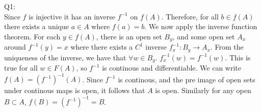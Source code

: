 \documentclass[letterpaper]{article}
\begin{document}
Q1: \\
Since $f$ is injective it has an inverse $f^{-1}$ on $f(A)$. Therefore, for all $b\in f(A)$ there exists a unique $a\in A$ where $f(a) = b$. 
We now apply the inverse function theorem. For each $y\in f(A)$, there is an open set $B_y$, and some open set $A_x$ around $f^{-1}(y)=x$ where there exists a $C^1$ inverse $f^{-1}_x: B_y \rightarrow A_x$. From the 
uniqueness of the inverse, we have that $\forall w\in B_y$. $f_x^{-1}(w)=f^{-1}(w)$. This is true for all $w\in F(A)$, so $f^{-1}$ is continous and differentiable. We can write $f(A) = (f^{-1})^{-1} (A)$. Since $f^{-1}$ is continous, and the pre image of open sets under continous maps is open, it follows that $A$ is open. Similarly for any open $B\subset A$, $f(B) = (f^{-1})^{-1}=B$. 
\end{document}
